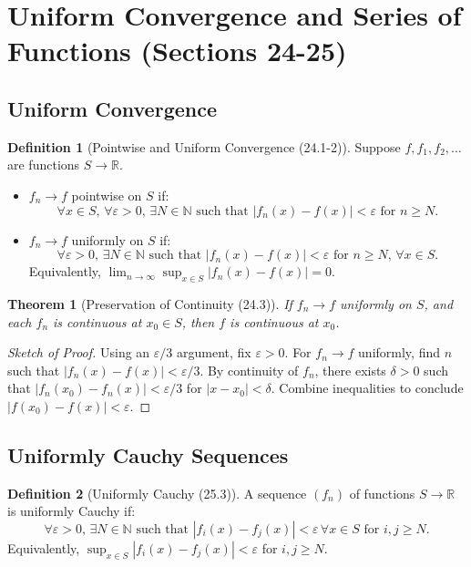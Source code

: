 \documentclass[9pt]{article}
\theoremstyle{definition}
\newtheorem{definition}{Definition}
\theoremstyle{plain}
\newtheorem{theorem}{Theorem}
\begin{document}
\section*{Uniform Convergence and Series of Functions (Sections 24-25)}

\subsection*{Uniform Convergence}
\begin{definition}[Pointwise and Uniform Convergence (24.1-2)]
Suppose \( f, f_1, f_2, \ldots \) are functions \( S \to \mathbb{R} \).
\begin{itemize}
    \item \( f_n \to f \) pointwise on \( S \) if:
    \[
    \forall x \in S, \, \forall \varepsilon > 0, \, \exists N \in \mathbb{N} \text{ such that } |f_n(x) - f(x)| < \varepsilon \text{ for } n \geq N.
    \]
    \item \( f_n \to f \) uniformly on \( S \) if:
    \[
    \forall \varepsilon > 0, \, \exists N \in \mathbb{N} \text{ such that } |f_n(x) - f(x)| < \varepsilon \text{ for } n \geq N, \, \forall x \in S.
    \]
    Equivalently, \( \lim_{n \to \infty} \sup_{x \in S} |f_n(x) - f(x)| = 0 \).
\end{itemize}
\end{definition}

\begin{theorem}[Preservation of Continuity (24.3)]
If \( f_n \to f \) uniformly on \( S \), and each \( f_n \) is continuous at \( x_0 \in S \), then \( f \) is continuous at \( x_0 \).
\end{theorem}

\begin{proof}[Sketch of Proof]
Using an \( \varepsilon/3 \) argument, fix \( \varepsilon > 0 \). For \( f_n \to f \) uniformly, find \( n \) such that \( |f_n(x) - f(x)| < \varepsilon/3 \). By continuity of \( f_n \), there exists \( \delta > 0 \) such that \( |f_n(x_0) - f_n(x)| < \varepsilon/3 \) for \( |x - x_0| < \delta \). Combine inequalities to conclude \( |f(x_0) - f(x)| < \varepsilon \).
\end{proof}

\subsection*{Uniformly Cauchy Sequences}
\begin{definition}[Uniformly Cauchy (25.3)]
A sequence \( (f_n) \) of functions \( S \to \mathbb{R} \) is uniformly Cauchy if:
\[
\forall \varepsilon > 0, \, \exists N \in \mathbb{N} \text{ such that } |f_i(x) - f_j(x)| < \varepsilon \, \forall x \in S \text{ for } i, j \geq N.
\]
Equivalently, \( \sup_{x \in S} |f_i(x) - f_j(x)| < \varepsilon \) for \( i, j \geq N \).
\end{definition}
\end{document}
